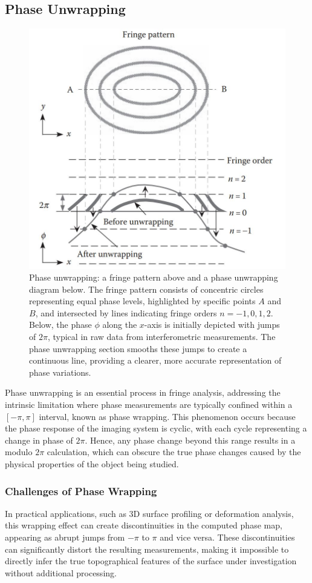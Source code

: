 \documentclass[../main.tex]{subfiles}
\begin{document}
\subsection{Phase Unwrapping}
\vspace{-8pt}
\begin{figure}
    \vspace{-5.5cm}
    \includegraphics[height=0.4\textwidth]{Images/Introduction/phase_unwrapping}
    \vspace{-8pt}
    \caption{Phase unwrapping: a fringe pattern above and a phase unwrapping diagram below. The fringe pattern consists of concentric circles representing equal phase levels, highlighted by specific points \(A\) and \(B\), and intersected by lines indicating fringe orders \(n = -1, 0, 1, 2\). Below, the phase \(\phi\) along the \(x\)-axis is initially depicted with jumps of \(2\pi\), typical in raw data from interferometric measurements. The phase unwrapping section smooths these jumps to create a continuous line, providing a clearer, more accurate representation of phase variations. \cite{fringe_analysis}}
    \label{fig:phase_wrapping}
\end{figure}
\begin{minipage}{0.5\textwidth}
Phase unwrapping is an essential process in fringe analysis, addressing the intrinsic limitation where phase measurements are typically confined within a $[-\pi, \pi]$ interval, known as phase wrapping. This phenomenon occurs because the phase response of the imaging system is cyclic, with each cycle representing a change in phase of $2\pi$. Hence, any phase change beyond this range results in a modulo $2\pi$ calculation, which can obscure the true phase changes caused by the physical properties of the object being studied.
\vspace{-10pt}
\subsubsection{Challenges of Phase Wrapping}
\vspace{-4pt}
In practical applications, such as 3D surface profiling or deformation analysis, this wrapping effect can create discontinuities in the computed phase map, appearing as abrupt jumps from $-\pi$ to $\pi$ and vice versa. These discontinuities can significantly distort the resulting measurements, making it impossible to directly infer the true topographical features of the surface under investigation without additional processing.
\end{minipage}
\end{document}
